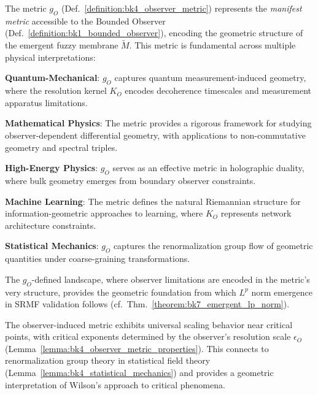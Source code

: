 \begin{scholium}
\label{scholium:bk4_role_of_observer_induced_metric}
The metric $g_O$ (Def.~\ref{definition:bk4_observer_metric}) represents the \textit{manifest metric} accessible to the Bounded Observer (Def.~\ref{definition:bk1_bounded_observer}), encoding the geometric structure of the emergent fuzzy membrane $\tilde{M}$. This metric is fundamental across multiple physical interpretations:

\textbf{Quantum-Mechanical}: $g_O$ captures quantum measurement-induced geometry, where the resolution kernel $K_O$ encodes decoherence timescales and measurement apparatus limitations.

\textbf{Mathematical Physics}: The metric provides a rigorous framework for studying observer-dependent differential geometry, with applications to non-commutative geometry and spectral triples.

\textbf{High-Energy Physics}: $g_O$ serves as an effective metric in holographic duality, where bulk geometry emerges from boundary observer constraints.

\textbf{Machine Learning}: The metric defines the natural Riemannian structure for information-geometric approaches to learning, where $K_O$ represents network architecture constraints.

\textbf{Statistical Mechanics}: $g_O$ captures the renormalization group flow of geometric quantities under coarse-graining transformations.

The $g_O$-defined landscape, where observer limitations are encoded in the metric's very structure, provides the geometric foundation from which $L^p$ norm emergence in SRMF validation follows (cf.~Thm.~\ref{theorem:bk7_emergent_lp_norm}).
\end{scholium}

\begin{remark}\label{remark:bk4_universality_scaling}
The observer-induced metric exhibits universal scaling behavior near critical points, with critical exponents determined by the observer's resolution scale $\epsilon_O$ (Lemma~\ref{lemma:bk4_observer_metric_properties}). This connects to renormalization group theory in statistical field theory (Lemma~\ref{lemma:bk4_statistical_mechanics}) and provides a geometric interpretation of Wilson's approach to critical phenomena.
\end{remark}

